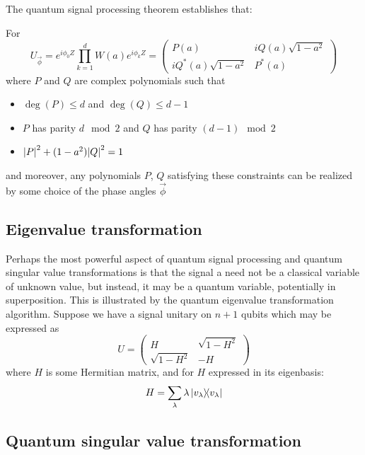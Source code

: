 The quantum signal processing theorem establishes that:
\begin{theorem}
    For 
    \begin{equation}
        U_{\vec{\phi}} = e^{i \phi_0 Z} \prod_{k=1}^d W(a) e^{i \phi_k Z} = \begin{pmatrix}
            P(a) & iQ(a)\sqrt{1-a^2} \\ iQ^*(a)\sqrt{1-a^2} & P^*(a)
        \end{pmatrix}
    \end{equation}
    where $P$ and $Q$ are complex polynomials such that 
    \begin{itemize}
        \item $\deg(P) \leq d$ and $\deg(Q) \leq d-1$
        \item $P$ has parity $d \!\mod 2$ and $Q$ has parity $(d-1) \!\mod 2$
        \item $\abs{P}^2 + (1-a^2) \abs{Q}^2 = 1$
    \end{itemize}
    and moreover, any polynomials $P$, $Q$ satisfying these constraints can be realized by some choice of the phase angles $\vec{\phi}$
\end{theorem}



\subsection{Eigenvalue transformation}
Perhaps the most powerful aspect of quantum signal processing and quantum singular value transformations is that the signal a need not be a classical variable of unknown value, but instead, it may be a quantum variable, potentially in superposition. This is illustrated by the quantum eigenvalue transformation algorithm. Suppose we have a signal unitary on $n + 1$ qubits which may be expressed as
\begin{equation}
    U = \begin{pmatrix}
        H & \sqrt{1-H^2} \\
        \sqrt{1-H^2} & -H
    \end{pmatrix}
\end{equation}
where $H$ is some Hermitian matrix, and for $H$ expressed in its eigenbasis:
\begin{equation}
    H = \sum_\lambda \lambda \ketbra{v_\lambda}
\end{equation}


\subsection{Quantum singular value transformation}



